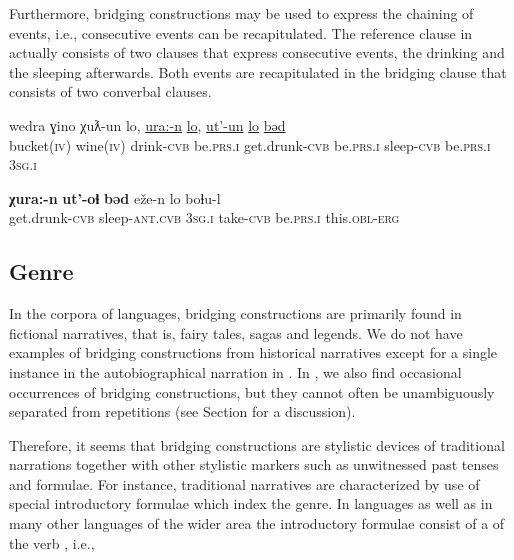 \documentclass[output=paper]{LSP/langsci}
\begin{document}
Furthermore, bridging constructions may be used to express the chaining of events, i.e., consecutive events can be recapitulated. The reference clause in  actually consists of two clauses that express consecutive events, the drinking and the sleeping afterwards. Both events are recapitulated in the bridging clause that consists of two converbal clauses.


\begin{exe}
	\ex	\label{ex:23ab}
	\begin{xlist}
		\ex	\label{ex:23a}
		\gll	wedra			ɣino		χuƛ-un		lo,				\underline{ura:-n}			\underline{lo}, \underline{ut'-un}			\underline{lo}				\underline{bəd}\\
			bucket(\textsc{iv})	wine(\textsc{iv})	drink-\textsc{cvb}	be.\textsc{prs.i}		get.drunk-\textsc{cvb}	be.\textsc{prs.i} sleep-\textsc{cvb}	be.\textsc{prs.i}		\textsc{3sg.i}\\
		\glt	{}

		\ex	\label{ex:23b}
		\gll	\textbf{χura:-n}			\textbf{ut'-oɬ}				\textbf{bəd}		eže-n			lo			boɬu-l \\
			get.drunk-\textsc{cvb}	sleep-\textsc{ant.cvb}	\textsc{3sg.i}		take-\textsc{cvb}		be.\textsc{prs.i}	this.\textsc{obl-erg}\\
		\glt	{} 
	\end{xlist}
\end{exe}

\subsection{Genre}
\label{ssec:Genre}
In the corpora of  languages, bridging constructions are primarily found in fictional narratives, that is, fairy tales, sagas and legends. We do not have examples of bridging constructions from historical narratives except for a single instance in the autobiographical narration in . In , we also find occasional occurrences of bridging constructions, but they cannot often be unambiguously separated from repetitions (see Section  for a discussion). 

Therefore, it seems that bridging constructions are stylistic devices of traditional narrations together with other stylistic markers such as unwitnessed past tenses and  formulae. For instance, traditional narratives are characterized by use of special introductory formulae which index the genre. In  languages as well as in many other languages of the wider area the introductory formulae consist of a  of the verb , i.e., 
\end{document}
